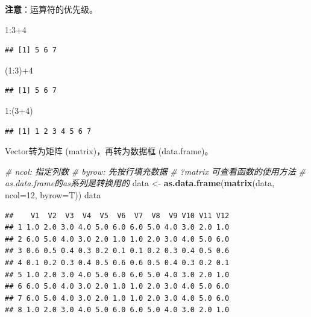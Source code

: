 \documentclass[]{article}
\newenvironment{Shaded}{\begin{snugshade}}{\end{snugshade}}
\newcommand{\KeywordTok}[1]{\textcolor[rgb]{0.13,0.29,0.53}{\textbf{{#1}}}}
\newcommand{\DataTypeTok}[1]{\textcolor[rgb]{0.13,0.29,0.53}{{#1}}}
\newcommand{\DecValTok}[1]{\textcolor[rgb]{0.00,0.00,0.81}{{#1}}}
\newcommand{\StringTok}[1]{\textcolor[rgb]{0.31,0.60,0.02}{{#1}}}
\newcommand{\CommentTok}[1]{\textcolor[rgb]{0.56,0.35,0.01}{\textit{{#1}}}}
\newcommand{\NormalTok}[1]{{#1}}
\numberwithin{figure}{section}
\numberwithin{table}{section}
\theoremstyle{definition}
\theoremstyle{definition}
\theoremstyle{definition}
\theoremstyle{remark}
\begin{document}
\textbf{注意}：运算符的优先级。

\begin{Shaded}
\begin{Highlighting}[]
\DecValTok{1}\NormalTok{:}\DecValTok{3+4}
\end{Highlighting}
\end{Shaded}

\begin{verbatim}
## [1] 5 6 7
\end{verbatim}

\begin{Shaded}
\begin{Highlighting}[]
\NormalTok{(}\DecValTok{1}\NormalTok{:}\DecValTok{3}\NormalTok{)+}\DecValTok{4}
\end{Highlighting}
\end{Shaded}

\begin{verbatim}
## [1] 5 6 7
\end{verbatim}

\begin{Shaded}
\begin{Highlighting}[]
\DecValTok{1}\NormalTok{:(}\DecValTok{3+4}\NormalTok{)}
\end{Highlighting}
\end{Shaded}

\begin{verbatim}
## [1] 1 2 3 4 5 6 7
\end{verbatim}

Vector转为矩阵 (matrix)，再转为数据框 (data.frame)。

\begin{Shaded}
\begin{Highlighting}[]
\CommentTok{# ncol: 指定列数}
\CommentTok{# byrow: 先按行填充数据}
\CommentTok{# ?matrix 可查看函数的使用方法}
\CommentTok{# as.data.frame的as系列是转换用的}
\NormalTok{data <-}\StringTok{ }\KeywordTok{as.data.frame}\NormalTok{(}\KeywordTok{matrix}\NormalTok{(data, }\DataTypeTok{ncol=}\DecValTok{12}\NormalTok{, }\DataTypeTok{byrow=}\NormalTok{T))}
\NormalTok{data}
\end{Highlighting}
\end{Shaded}

\begin{verbatim}
##    V1  V2  V3  V4  V5  V6  V7  V8  V9 V10 V11 V12
## 1 1.0 2.0 3.0 4.0 5.0 6.0 6.0 5.0 4.0 3.0 2.0 1.0
## 2 6.0 5.0 4.0 3.0 2.0 1.0 1.0 2.0 3.0 4.0 5.0 6.0
## 3 0.6 0.5 0.4 0.3 0.2 0.1 0.1 0.2 0.3 0.4 0.5 0.6
## 4 0.1 0.2 0.3 0.4 0.5 0.6 0.6 0.5 0.4 0.3 0.2 0.1
## 5 1.0 2.0 3.0 4.0 5.0 6.0 6.0 5.0 4.0 3.0 2.0 1.0
## 6 6.0 5.0 4.0 3.0 2.0 1.0 1.0 2.0 3.0 4.0 5.0 6.0
## 7 6.0 5.0 4.0 3.0 2.0 1.0 1.0 2.0 3.0 4.0 5.0 6.0
## 8 1.0 2.0 3.0 4.0 5.0 6.0 6.0 5.0 4.0 3.0 2.0 1.0
\end{verbatim}
\end{document}
